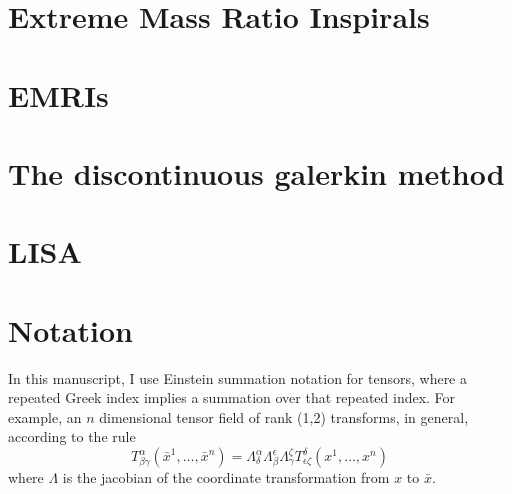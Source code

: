 
\section{Extreme Mass Ratio Inspirals}

\section{EMRIs}
\section{The discontinuous galerkin method}
\section{LISA}


\section{Notation}
In this manuscript, I use Einstein summation notation for tensors, where a repeated Greek index implies a summation over that repeated index. For example, an $n$ dimensional tensor field of rank (1,2) transforms, in general, according to the rule
\begin{equation}
  T^\alpha_{\beta\gamma}(\bar{x}^1,\ldots,\bar{x}^n)=\Lambda^\alpha_\delta\Lambda^\epsilon_\beta\Lambda^\zeta_\gamma T^\delta_{\epsilon\zeta}(x^1,\ldots,x^n)
\end{equation}
where $\Lambda$ is the jacobian of the coordinate transformation from $x$ to $\bar{x}$. 

